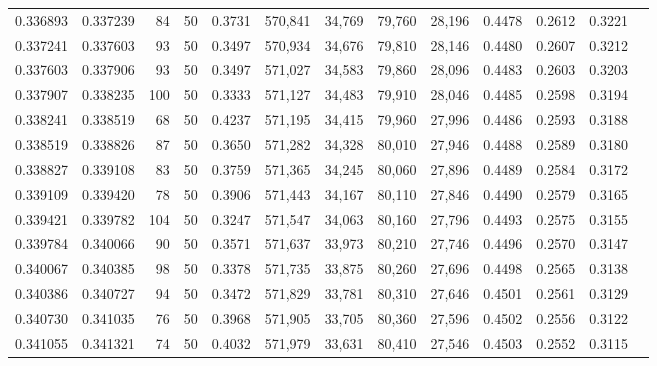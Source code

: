 \begin{tabular}{rrrrrrrrrrrrr}
0.336893 & 0.337239 &    84 &  50 &                                     0.3731 & 570,841 &  34,769 &  79,760 &  28,196 & 0.4478 & 0.2612 & 0.3221 \\
0.337241 & 0.337603 &    93 &  50 &                                     0.3497 & 570,934 &  34,676 &  79,810 &  28,146 & 0.4480 & 0.2607 & 0.3212 \\
0.337603 & 0.337906 &    93 &  50 &                                     0.3497 & 571,027 &  34,583 &  79,860 &  28,096 & 0.4483 & 0.2603 & 0.3203 \\
0.337907 & 0.338235 &   100 &  50 &                                     0.3333 & 571,127 &  34,483 &  79,910 &  28,046 & 0.4485 & 0.2598 & 0.3194 \\
0.338241 & 0.338519 &    68 &  50 &                                     0.4237 & 571,195 &  34,415 &  79,960 &  27,996 & 0.4486 & 0.2593 & 0.3188 \\
0.338519 & 0.338826 &    87 &  50 &                                     0.3650 & 571,282 &  34,328 &  80,010 &  27,946 & 0.4488 & 0.2589 & 0.3180 \\
0.338827 & 0.339108 &    83 &  50 &                                     0.3759 & 571,365 &  34,245 &  80,060 &  27,896 & 0.4489 & 0.2584 & 0.3172 \\
0.339109 & 0.339420 &    78 &  50 &                                     0.3906 & 571,443 &  34,167 &  80,110 &  27,846 & 0.4490 & 0.2579 & 0.3165 \\
0.339421 & 0.339782 &   104 &  50 &                                     0.3247 & 571,547 &  34,063 &  80,160 &  27,796 & 0.4493 & 0.2575 & 0.3155 \\
0.339784 & 0.340066 &    90 &  50 &                                     0.3571 & 571,637 &  33,973 &  80,210 &  27,746 & 0.4496 & 0.2570 & 0.3147 \\
0.340067 & 0.340385 &    98 &  50 &                                     0.3378 & 571,735 &  33,875 &  80,260 &  27,696 & 0.4498 & 0.2565 & 0.3138 \\
0.340386 & 0.340727 &    94 &  50 &                                     0.3472 & 571,829 &  33,781 &  80,310 &  27,646 & 0.4501 & 0.2561 & 0.3129 \\
0.340730 & 0.341035 &    76 &  50 &                                     0.3968 & 571,905 &  33,705 &  80,360 &  27,596 & 0.4502 & 0.2556 & 0.3122 \\
0.341055 & 0.341321 &    74 &  50 &                                     0.4032 & 571,979 &  33,631 &  80,410 &  27,546 & 0.4503 & 0.2552 & 0.3115 \\

\end{tabular}
